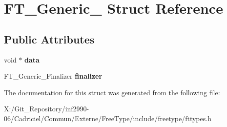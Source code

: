\hypertarget{struct_f_t___generic__}{\section{F\-T\-\_\-\-Generic\-\_\- Struct Reference}
\label{struct_f_t___generic__}
}
\subsection*{Public Attributes}
\begin{DoxyCompactItemize}
\item 
\hypertarget{struct_f_t___generic___af0bf8b983254b662f293e9a20505e27e}{void $\ast$ {\bfseries data}}\label{struct_f_t___generic___af0bf8b983254b662f293e9a20505e27e}

\item 
\hypertarget{struct_f_t___generic___a20fce8de90cc9e3876935817247b9ccc}{F\-T\-\_\-\-Generic\-\_\-\-Finalizer {\bfseries finalizer}}\label{struct_f_t___generic___a20fce8de90cc9e3876935817247b9ccc}

\end{DoxyCompactItemize}


The documentation for this struct was generated from the following file\-:\begin{DoxyCompactItemize}
\item 
X\-:/\-Git\-\_\-\-Repository/inf2990-\/06/\-Cadriciel/\-Commun/\-Externe/\-Free\-Type/include/freetype/fttypes.\-h\end{DoxyCompactItemize}
